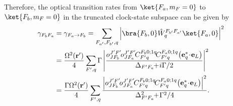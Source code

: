 Therefore, the optical transition rates from $ \ket{F_a,m_F=0} $ to $ \ket{F_b,m_F=0} $ in the truncated clock-state subspace can be given by
\begin{align}
\gamma_{F_bF_a} &=\gamma_{F_a\rightarrow F_b} = \sum_{F_{a'},F_{b'},q} \left| \bra{F_b,0} \hat{W}_q^{F_{b'}F_{a'}}\ket{F_a,0}\right|^2\\
&= \frac{\Omega^2(\mathbf{r}')}{4}\sum_{F',q} \Gamma\left|  \frac{o^{J'F'}_{JF_b}\! o^{J'F'}_{JF_a}\!  C^{F_b 0;1q}_{F' q}\! C^{F_a 0;1q}_{F' q}\! \left(\mathbf{e}^*_{q}\! \cdot\! \mathbf{e}_L \right)}{ \Delta_{F'F_a} \!\!+\! i\Gamma/2} \right|^2\\
&= \frac{\Gamma\Omega^2(\mathbf{r}')}{4}\sum_{F',q}   \frac{ \left|o^{J'F'}_{JF_b}\! o^{J'F'}_{JF_a}\!  C^{F_b 0;1q}_{F' q}\! C^{F_a 0;1q}_{F' q}\! \left(\mathbf{e}^*_{q}\! \cdot\! \mathbf{e}_L \right)\right|^2}{ \Delta_{F'F_a}^2 \!\!+\! \Gamma^2/4} .
\end{align} 

